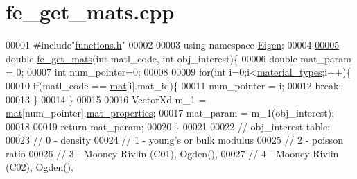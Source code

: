 \hypertarget{fe__get__mats_8cpp_source}{}\section{fe\+\_\+get\+\_\+mats.\+cpp}
\label{fe__get__mats_8cpp_source}

\begin{DoxyCode}
00001 \textcolor{preprocessor}{#include"\hyperlink{functions_8h}{functions.h}"}
00002 
00003 \textcolor{keyword}{using namespace }\hyperlink{namespace_eigen}{Eigen};
00004 
\hyperlink{fe__get__mats_8cpp_af7ffbad6dfcc99fc88b130c1a7b1720a}{00005} \textcolor{keywordtype}{double} \hyperlink{fe__get__mats_8cpp_af7ffbad6dfcc99fc88b130c1a7b1720a}{fe\_get\_mats}(\textcolor{keywordtype}{int} matl\_code, \textcolor{keywordtype}{int} obj\_interest)\{
00006     \textcolor{keywordtype}{double} mat\_param = 0;
00007     \textcolor{keywordtype}{int} num\_pointer=0;
00008 
00009     \textcolor{keywordflow}{for}(\textcolor{keywordtype}{int} i=0;i<\hyperlink{_global_variables_8h_a39328cf72d69139b3b6c5b8ef6c636fe}{material\_types};i++)\{
00010             \textcolor{keywordflow}{if}(matl\_code == \hyperlink{_global_variables_8h_acfa6799b35f9301b5fc44e6043624797}{mat}[i].mat\_id)\{
00011                 num\_pointer = i;
00012                 \textcolor{keywordflow}{break};
00013             \}
00014     \}
00015 
00016     VectorXd m\_1 = \hyperlink{_global_variables_8h_acfa6799b35f9301b5fc44e6043624797}{mat}[num\_pointer].\hyperlink{class_materials_af663f6cf518ba3f857bac40a1e33eac0}{mat\_properties};
00017     mat\_param = m\_1(obj\_interest);
00018 
00019     \textcolor{keywordflow}{return} mat\_param;
00020 \}
00021 
00022 \textcolor{comment}{// obj\_interest table:}
00023 \textcolor{comment}{// 0 - density}
00024 \textcolor{comment}{// 1 - young's or bulk modulus}
00025 \textcolor{comment}{// 2 - poisson ratio}
00026 \textcolor{comment}{// 3 - Mooney Rivlin (C01), Ogden(),}
00027 \textcolor{comment}{// 4 - Mooney Rivlin (C02), Ogden(),}
\end{DoxyCode}
